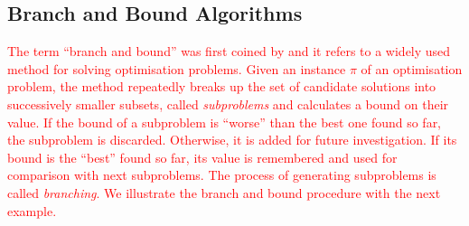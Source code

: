 \documentclass{mprop}
\theoremstyle{definition}
\begin{document}
\subsection{Branch and Bound Algorithms}
\label{branchandbound}
\textcolor{red}{
The term ``branch and bound'' was first coined by \citet{Little63} and it refers to a widely used method for solving optimisation problems. Given an instance $\pi$ of an optimisation problem, the method repeatedly breaks up the set of candidate solutions into successively smaller subsets, called \textit{subproblems} and calculates a bound on their value. If the bound of a subproblem  is ``worse'' than the best one found so far, the subproblem is discarded. Otherwise, it is added for future investigation. If its bound is the ``best'' found so far, its value is remembered and used for comparison with next subproblems. The process of generating subproblems is called \textit{branching}. We illustrate the branch and bound procedure with the next example.}
\end{document}
